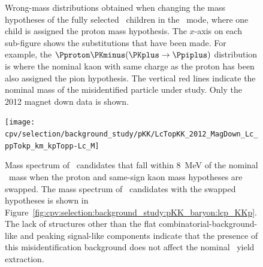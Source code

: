 \begin{figure}
  \caption{%
    Wrong-mass distributions obtained when changing the mass hypotheses of the
    fully selected \PLambdac\ children in the \pKK\ mode, where one child is
    assigned the proton mass hypothesis.
    The $x$-axis on each sub-figure shows the substitutions that have been
    made.
    For example, the ${\Pproton\PKminus(\PKplus \to \Ppiplus)}$ distribution is where the
    nominal kaon with same charge as the proton has been also assigned the pion
    hypothesis.
    The vertical red lines indicate the nominal mass of the misidentified 
    particle under study.
    Only the 2012 magnet down data is shown.
  }
  \label{fig:cpv:selection:background_study:pKK_baryon}
\end{figure}

\begin{figure}
  \centering
  \texttt{[image: cpv/selection/background\_study/pKK/LcTopKK\_2012\_MagDown\_Lc\_ppTokp\_km\_kpTopp-Lc\_M]}
  \caption{%
    Mass spectrum of \pKK\ candidates that fall within \SI{8}{\MeV} of the
    nominal \PLambdac\ mass when the proton and same-sign kaon mass hypotheses
    are swapped.
    The mass spectrum of \PLambdac\ candidates with the swapped hypotheses is
    shown in
    Figure~\ref{fig:cpv:selection:background_study:pKK_baryon:lcp_KKp}.
    The lack of structures other than the flat combinatorial-background-like
    and peaking signal-like components indicate that the presence of this
    misidentification background does not affect the nominal \pKK\ yield
    extraction.
  }
  \label{fig:cpv:selection:background_study:pKK_lcp_KKp_Lc_M}
\end{figure}

